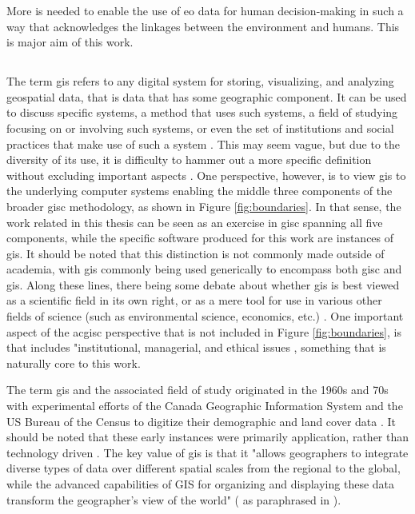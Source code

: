 More is needed to enable the use of \ac{eo} data for human decision-making in such a way that acknowledges the linkages between the environment and humans. This is major aim of this work. 


\subsection{} \label{sec:gis}

The term \ac{gis} refers to any digital system for storing, visualizing, and analyzing geospatial data, that is data that has some geographic component. It can be used to discuss specific systems, a method that uses such systems, a field of studying focusing on or involving such systems, or even the set of institutions and social practices that make use of such a system \cite{sheppardGISSocietyResearch1995}. This may seem vague, but due to the diversity of its use, it is difficulty to hammer out a more specific definition without excluding important aspects \cite{goodchildOverviewDefinitionGIS1992, picklesToolScienceGIS1997, chrismanWhatDoesGIS1999, heikkilaGISDeadLong1998}. One perspective, however, is to view \ac{gis} to the underlying computer systems enabling the middle three components of the broader \ac{gisc} methodology, as shown in Figure \ref{fig:boundaries}. In that sense, the work related in this thesis can be seen as an exercise in \ac{gisc} spanning all five components, while the specific software produced for this work are instances of \ac{gis}. It should be noted that this distinction is not commonly made outside of academia, with \ac{gis} commonly being used generically to encompass both \ac{gisc} and \ac{gis}. Along these lines, there being some debate about whether \ac{gis} is best viewed as a scientific field in its own right, or as a mere tool for use in various other fields of science (such as environmental science, economics, etc.) \cite{goodchildGeographicalInformationScience1992,goodchildTwentyYearsProgress2010}. One important aspect of the 
ac{gisc} perspective that is not included in Figure \ref{fig:boundaries}, is that includes "institutional, managerial, and ethical issues \cite{goodchildGeographicalInformationScience1992}, something that is naturally core to this work. 

The term \ac{gis} and the associated field of study originated in the 1960s and 70s with experimental efforts of the Canada Geographic Information System and the US Bureau of the Census to digitize their demographic and land cover data \cite{goodchildGeographicInformationSystems1994}. It should be noted that these early instances were primarily application, rather than technology driven \cite{goodchildGeographicalInformationScience1992}. The key value of \ac{gis} is that it "allows geographers to integrate diverse types of data over different spatial scales from the regional to the global, while the advanced capabilities of GIS for organizing and displaying these data transform the geographer's view of the world" (\cite{tomlinsonPRESIDENTIALADDRESSGEOGRAPHIC1989} as paraphrased in \cite{vereginComputerInnovationAdoption1994}).

